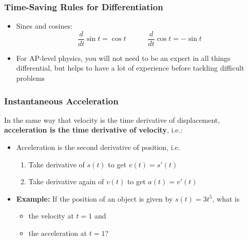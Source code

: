 \documentclass[12pt,compress,aspectratio=169]{beamer}
\begin{document}
\begin{frame}
  \frametitle{Time-Saving Rules for Differentiation}
  \begin{itemize}
  \item Sines and cosines:
    {\large
      \begin{displaymath}
      \frac{d}{dt}\sin t = \cos t\quad\quad\quad
      \frac{d}{dt}\cos t = -\sin t
      \end{displaymath}
    }
  \item For AP-level physics, you will not need to be an expert in all things
    differential, but helps to have a lot of experience before tackling
    difficult problems
  \end{itemize}
\end{frame}

\begin{frame}
  \frametitle{Instantaneous Acceleration}
  In the same way that velocity is the time derivative of displacement,
  \textbf{acceleration is the time derivative of velocity}, i.e.:

  \begin{itemize}
  \item Acceleration is the second derivative of position, i.e.
    \begin{enumerate}
    \item Take derivative of $s(t)$ to get $v(t)=s'(t)$
    \item Take derivative again of $v(t)$ to get $a(t)=v'(t)$
    \end{enumerate}
  \item<2->\textbf{Example:} If the position of an object is given by
    $\displaystyle s(t)=3t^5$, what is
    \begin{itemize}
    \item the velocity at $t=1$ and
    \item the acceleration at $t=1$?
    \end{itemize}
  \end{itemize}
\end{frame}
\end{document}
